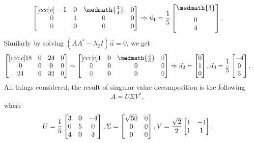 \begin{solution}
\[\begin{bmatrix}[ccc|c]
            -1 & 0 & \medmath{\frac{3}{4}} & 0\\
            0 & 1 & 0 & 0\\
            0 & 0 & 0 & 0
        \end{bmatrix} \Rightarrow \vec u_1 = \dfrac{1}{5}\begin{bmatrix}
        \medmath{3} \\[0.2cm] 0 \\ 4
    \end{bmatrix}.
    \]
    Similarly by solving $(AA^*-\lambda_2 I)\vec u=0$,  we get
    \[
        \begin{bmatrix}[ccc|c]
            18 & 0 & 24 & 0\\
            0 & 0 & 0 & 0\\
            24 & 0 & 32 & 0
        \end{bmatrix}  \sim \begin{bmatrix}[ccc|c]
            1 & 0 & \medmath{\frac{4}{3}} & 0\\
            0 & 0 & 0 & 0\\
            0 & 0 & 0 & 0
        \end{bmatrix} \Rightarrow 
        \vec u_2 = 
        \begin{bmatrix}
            0 \\ 1 \\ 0
        \end{bmatrix},
        \vec u_3 = 
        \dfrac{1}{5}
        \begin{bmatrix}
            -4 \\ 0 \\ 3
        \end{bmatrix}.
    \]
    All things considered, the result of singular value decomposition is the following
    $$
    A=U\Sigma V^*,
  $$
  where 
    \[
        U = \dfrac{1}{5}\begin{bmatrix}
            3 & 0 & -4\\
            0 & 5 & 0\\
            4 & 0 & 3
        \end{bmatrix}, \vspace*{0.5cm} \Sigma = \begin{bmatrix}
            \sqrt{50} & 0\\
            0 & 0\\
            0 & 0
        \end{bmatrix}, \vspace*{0.5cm} V = \frac{\sqrt{2}}{2} \begin{bmatrix}
            1 & -1 \\
            1 & 1
        \end{bmatrix}.
    \]
\end{solution}
